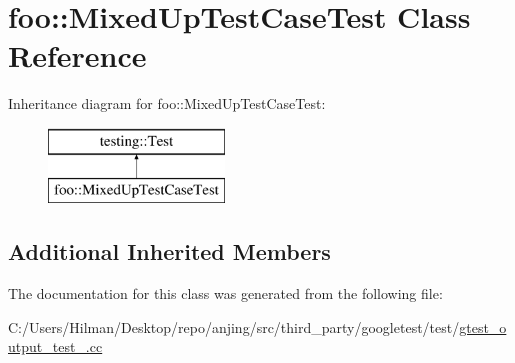 \hypertarget{classfoo_1_1_mixed_up_test_case_test}{}\section{foo\+:\+:Mixed\+Up\+Test\+Case\+Test Class Reference}
\label{classfoo_1_1_mixed_up_test_case_test}
Inheritance diagram for foo\+:\+:Mixed\+Up\+Test\+Case\+Test\+:\begin{figure}[H]
\begin{center}
\leavevmode
\includegraphics[height=2.000000cm]{classfoo_1_1_mixed_up_test_case_test}
\end{center}
\end{figure}
\subsection*{Additional Inherited Members}


The documentation for this class was generated from the following file\+:\begin{DoxyCompactItemize}
\item 
C\+:/\+Users/\+Hilman/\+Desktop/repo/anjing/src/third\+\_\+party/googletest/test/\hyperlink{gtest__output__test___8cc}{gtest\+\_\+output\+\_\+test\+\_\+.\+cc}\end{DoxyCompactItemize}
